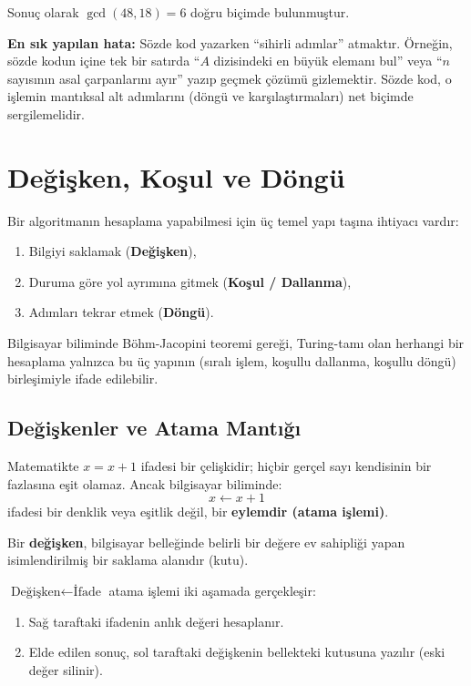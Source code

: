 Sonuç olarak $\gcd(48, 18) = 6$ doğru biçimde bulunmuştur.

\begin{caution}
\textbf{En sık yapılan hata:} Sözde kod yazarken ``sihirli adımlar'' atmaktır. Örneğin, sözde kodun içine tek bir satırda ``$A$ dizisindeki en büyük elemanı bul'' veya ``$n$ sayısının asal çarpanlarını ayır'' yazıp geçmek çözümü gizlemektir. Sözde kod, o işlemin mantıksal alt adımlarını (döngü ve karşılaştırmaları) net biçimde sergilemelidir.
\end{caution}

\section{Değişken, Koşul ve Döngü}

Bir algoritmanın hesaplama yapabilmesi için üç temel yapı taşına ihtiyacı vardır:
\begin{enumerate}
    \item Bilgiyi saklamak (\textbf{Değişken}),
    \item Duruma göre yol ayrımına gitmek (\textbf{Koşul / Dallanma}),
    \item Adımları tekrar etmek (\textbf{Döngü}).
\end{enumerate}
Bilgisayar biliminde Böhm-Jacopini teoremi gereği, Turing-tamı olan herhangi bir hesaplama yalnızca bu üç yapının (sıralı işlem, koşullu dallanma, koşullu döngü) birleşimiyle ifade edilebilir.

\subsection{Değişkenler ve Atama Mantığı}

Matematikte $x = x + 1$ ifadesi bir çelişkidir; hiçbir gerçel sayı kendisinin bir fazlasına eşit olamaz. Ancak bilgisayar biliminde:
\[ x \leftarrow x + 1 \]
ifadesi bir denklik veya eşitlik değil, bir \textbf{eylemdir (atama işlemi)}.

\begin{definition}
Bir \textbf{değişken}, bilgisayar belleğinde belirli bir değere ev sahipliği yapan isimlendirilmiş bir saklama alanıdır (kutu). 

$\text{Değişken} \leftarrow \text{İfade}$ atama işlemi iki aşamada gerçekleşir:
\begin{enumerate}
    \item Sağ taraftaki ifadenin anlık değeri hesaplanır.
    \item Elde edilen sonuç, sol taraftaki değişkenin bellekteki kutusuna yazılır (eski değer silinir).
\end{enumerate}
\end{definition}

